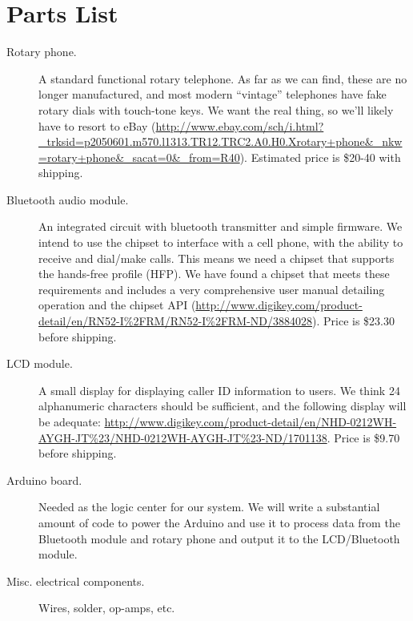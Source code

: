 \documentclass[11pt]{article}
\begin{document}
    \section{Parts List}
        \begin{description}
            \item[Rotary phone.] A standard functional rotary telephone. As far as we can find, these are no longer manufactured, and most modern ``vintage'' telephones have fake rotary dials with touch-tone keys. We want the real thing, so we'll likely have to resort to eBay (\url{http://www.ebay.com/sch/i.html?_trksid=p2050601.m570.l1313.TR12.TRC2.A0.H0.Xrotary+phone&_nkw=rotary+phone&_sacat=0&_from=R40}). Estimated price is \$20-40 with shipping.
            \item[Bluetooth audio module.] An integrated circuit with bluetooth transmitter and simple firmware. We intend to use the chipset to interface with a cell phone, with the ability to receive and dial/make calls. This means we need a chipset that supports the hands-free profile (HFP). We have found a chipset that meets these requirements and includes a very comprehensive user manual detailing operation and the chipset API (\url{http://www.digikey.com/product-detail/en/RN52-I%2FRM/RN52-I%2FRM-ND/3884028}). Price is \$23.30 before shipping.
            \item[LCD module.] A small display for displaying caller ID information to users. We think 24 alphanumeric characters should be sufficient, and the following display will be adequate: \url{http://www.digikey.com/product-detail/en/NHD-0212WH-AYGH-JT%23/NHD-0212WH-AYGH-JT%23-ND/1701138}. Price is \$9.70 before shipping.
            \item[Arduino board.] Needed as the logic center for our system. We will write a substantial amount of code to power the Arduino and use it to process data from the Bluetooth module and rotary phone and output it to the LCD/Bluetooth module.
            \item[Misc. electrical components.] Wires, solder, op-amps, etc.
        \end{description}
\end{document}

